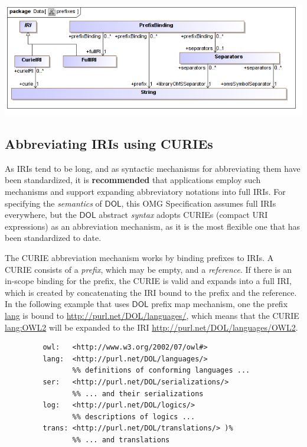\documentclass[10pt,fleqn,final]{scrreprt}
\newcommand*{\recommended}{\textbf{recommended}\xspace}
\newcommand*{\IS}{OMG Specification\xspace}
\newcommand*{\DOL}{\ensuremath{\mathsf{DOL}}\xspace}
\newcommand{\ssclause}[1]{\subsection{#1}}
\newenvironment{definitions}[0]{\medskip }{}
\begin{document}
\begin{definitions}
\medskip
\begin{center}
\includegraphics[scale=0.47]{mof/prefixes.png}
\end{center}



%
\ssclause{Abbreviating IRIs using CURIEs}\label{c:curies}

As IRIs tend to be long, and as syntactic mechanisms for abbreviating them have been standardized, 
it is \recommended that applications employ such mechanisms and support expanding abbreviatory
notations into full IRIs.  For specifying the \emph{semantics} of \DOL, this \IS assumes full IRIs 
everywhere, but the \DOL abstract \emph{syntax} adopts CURIEs (compact URI expressions) as an 
abbreviation mechanism, as it is the most flexible one that has been standardized to date.  

The CURIE abbreviation mechanism works by binding prefixes to IRIs.  A CURIE consists of a 
\emph{prefix}, which may be empty, and a \emph{reference}.  If there is an in-scope binding for the 
prefix, the CURIE is valid and expands into a full IRI, which is created by concatenating the IRI 
bound to the prefix and the reference.  In the following example that uses \DOL prefix map mechanism, one the prefix \url{lang} is bound to \url{http://purl.net/DOL/languages/}, which
means that the CURIE \url{lang:OWL2} will be expanded to the IRI
\url{http://purl.net/DOL/languages/OWL2}.

\begin{lstlisting}[basicstyle=\ttfamily,language=dolText,morekeywords={props,ObjectProperty,Class,DisjointUnionOf,SubClassOf,Characteristics,Transitive,Asymmetric,SubPropertyOf,DisjointClasses,EquivalentTo,inverse,only,forall,iff,if,or,exists,import},escapechar=@,mathescape]
%prefix( :      <http://www.example.org/mereology#>
         owl:   <http://www.w3.org/2002/07/owl#>
         lang:  <http://purl.net/DOL/languages/>
                %% definitions of conforming languages ...
         ser:   <http://purl.net/DOL/serializations/>
                %% ... and their serializations
         log:   <http://purl.net/DOL/logics/>
                %% descriptions of logics ...
         trans: <http://purl.net/DOL/translations/> )%
                %% ... and translations


\end{lstlisting}
\end{definitions}
\end{document}
